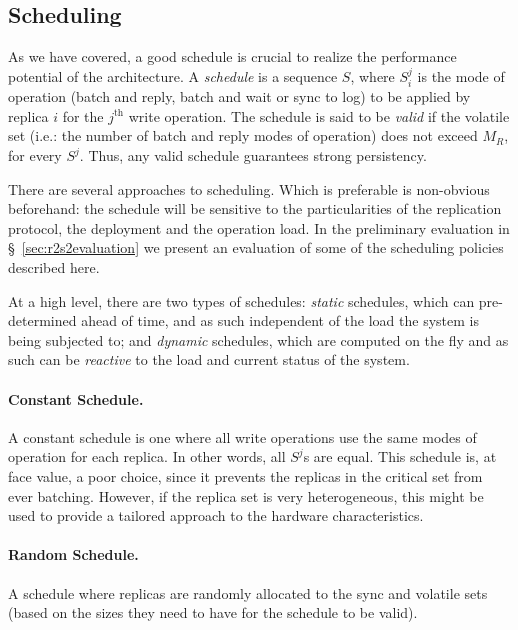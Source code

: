 \subsection{Scheduling}\label{ssec:schedule}


As we have covered, a good schedule is crucial to realize the
performance potential of the architecture. A \emph{schedule} is a
sequence $S$, where $S_i^j$ is the mode of operation (batch and
reply, batch and wait or sync to log) to be applied by replica
$i$ for the $j^\text{th}$ write operation. The
schedule is said to be \emph{valid} if the volatile set (i.e.:
the number of batch and reply modes of operation) does not exceed
$M_R$, for every $S^j$. Thus, any valid schedule guarantees strong persistency.

There are several approaches to scheduling. Which is preferable
is non-obvious beforehand: the schedule will be sensitive to the
particularities of the replication protocol, the deployment and
the operation load. In the preliminary evaluation in
\S~\ref{sec:r2s2evaluation} we present an
evaluation of some of the scheduling policies described
here.

At a high level, there are two types of schedules: \emph{static}
schedules, which can pre-determined ahead of time, and as such
independent of the load the system is being subjected to; and
\emph{dynamic} schedules, which are computed on the fly and as
such can be \emph{reactive} to the load and current status of the
system.


\paragraph{Constant Schedule.} A constant schedule is one where
all write operations use the same modes of operation for each
replica. In other words, all $S^j$s are equal. This schedule is,
at face value, a poor choice, since it prevents the replicas in the
critical set from ever batching. However, if the replica set is
very heterogeneous, this might be used to provide a tailored
approach to the hardware characteristics.

\paragraph{Random Schedule.} A schedule where replicas are
randomly allocated to the sync and volatile sets (based on the
sizes they need to have for the schedule to be valid).

